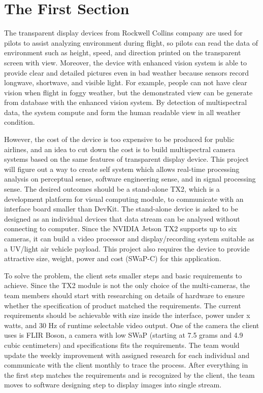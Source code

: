 \documentclass[onecolumn, draftclsnofoot,10pt, compsoc]{IEEEtran}
\begin{document}
\section{The First Section}
The transparent display devices from Rockwell Collins company are used for pilots to assist analyzing environment during flight, so pilots can read the data of environment such as height, speed, and direction printed on the transparent screen with view. Moreover, the device with enhanced vision system is able to provide clear and detailed pictures even in bad weather because sensors record longwave, shortwave, and visible light. For example, people can not have clear vision when flight in foggy weather, but the demonstrated view can be generate from database with the enhanced vision system. By detection of multispectral data, the system compute and form the human readable view in all weather condition.

However, the cost of the device is too expensive to be produced for public airlines, and an idea to cut down the cost is to build multispectral camera systems based on the same features of transparent display device. This project will figure out a way to create self system which allows real-time processing analysis on perceptual sense, software engineering sense, and in signal processing sense. The desired outcomes should be a stand-alone TX2, which is a development platform for visual computing module, to communicate with an interface board smaller than DevKit. The stand-alone device is asked to be designed as an individual devices that data stream can be analysed without connecting to computer. Since the NVIDIA Jetson TX2 supports up to six cameras, it can build a video processor and display/recording system suitable as a UV/light air vehicle payload. This project also requires the device to provide attractive size, weight, power and cost (SWaP-C) for this application.

To solve the problem, the client sets smaller steps and basic requirements to achieve. Since the TX2 module is not the only choice of the multi-cameras, the team members should start with researching on details of hardware to ensure whether the specification of product matched the requirements. The current requirements should be achievable with size inside the interface, power under x watts, and 30 Hz of runtime selectable video output. One of the camera the client uses is FLIR Boson, a camera with low SWaP (starting at 7.5 grams and 4.9 cubic centimeters) and specifications fits the requirements. The team would update the weekly improvement with assigned research for each individual and communicate with the client monthly to trace the process. After everything in the first step matches the requirements and is recognized by the client, the team moves to software designing step to display images into single stream.
\end{document}
